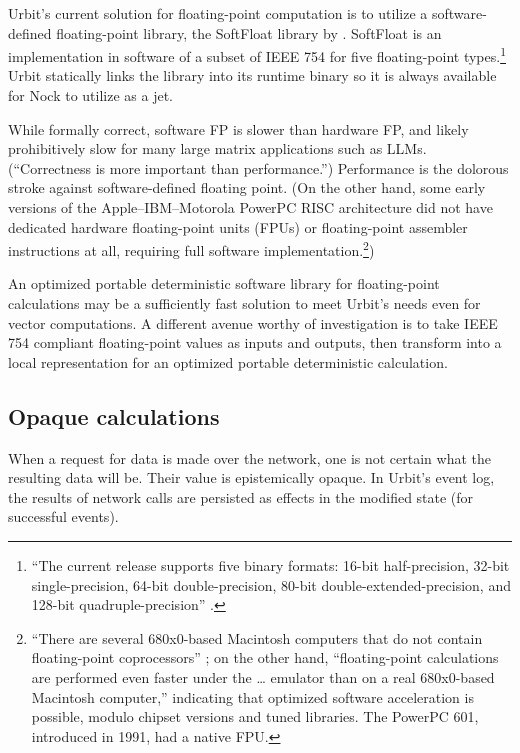 \documentclass[twoside]{article}
\begin{document}
Urbit's current solution for floating-point computation is to utilize a software-defined floating-point library, the SoftFloat library by \citeauthor{Hauser2018}.  SoftFloat is an implementation in software of a subset of IEEE 754 for five floating-point types.\footnote{“The current release supports five binary formats: 16-bit half-precision, 32-bit single-precision, 64-bit double-precision, 80-bit double-extended-precision, and 128-bit quadruple-precision” \citep{Hauser2018}.}  Urbit statically links the library into its runtime binary so it is always available for Nock to utilize as a jet.

While formally correct, software FP is slower than hardware FP, and likely prohibitively slow for many large matrix applications such as LLMs.  (“Correctness is more important than performance.”)  Performance is the dolorous stroke against software-defined floating point.  (On the other hand, some early versions of the Apple–IBM–Motorola PowerPC RISC architecture did not have dedicated hardware floating-point units (FPUs) or floating-point assembler instructions at all, requiring full software implementation.\footnote{“There are several 680x0-based Macintosh computers that do not contain floating-point coprocessors” \citep{Apple1996}; on the other hand, “floating-point calculations are performed even faster under the … emulator than on a real 680x0-based Macintosh computer,” indicating that optimized software acceleration is possible, modulo chipset versions and tuned libraries.  The PowerPC 601, introduced in 1991, had a native FPU.})

An optimized portable deterministic software library for floating-point calculations may be a sufficiently fast solution to meet Urbit's needs even for vector computations.  A different avenue worthy of investigation is to take IEEE 754 compliant floating-point values as inputs and outputs, then transform into a local representation for an optimized portable deterministic calculation.

\subsection{Opaque calculations}

When a request for data is made over the network, one is not certain what the resulting data will be.  Their value is epistemically opaque.  In Urbit's event log, the results of network calls are persisted as effects in the modified state (for successful events).
\end{document}
